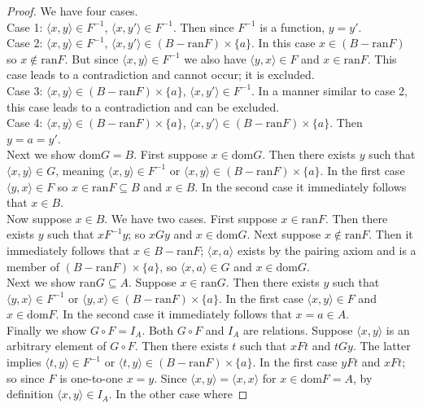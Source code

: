 \documentclass{report}
\begin{document}
\begin{proof}
We have four cases.\\
\indent Case 1: $\langle x,y\rangle\in F^{-1}$, $\langle x,y'\rangle\in F^{-1}$. Then since $F^{-1}$ is a function, $y=y'$.\\
\indent Case 2: $\langle x,y\rangle\in F^{-1}$, $\langle x,y'\rangle\in(B-\text{ran}F)\times\{a\}$.
In this case $x\in(B-\text{ran}F)$ so $x\notin\text{ran}F$. But since $\langle x,y\rangle\in F^{-1}$ we also have $\langle y,x\rangle\in F$ and $x\in\text{ran}F$. 
This case leads to a contradiction and cannot occur; it is excluded.\\
\indent Case 3: $\langle x,y\rangle\in(B-\text{ran}F)\times\{a\}$, $\langle x,y'\rangle\in F^{-1}$.
In a manner similar to case 2, this case leads to a contradiction and can be excluded.\\
\indent Case 4: $\langle x,y\rangle\in(B-\text{ran}F)\times\{a\}$, $\langle x,y'\rangle\in(B-\text{ran}F)\times\{a\}$. Then $y=a=y'$.\\
\indent Next we show dom$G=B$. First suppose $x\in\text{dom}G$. Then there exists $y$ such that $\langle x,y\rangle\in G$, meaning $\langle x,y\rangle\in F^{-1}$ or 
$\langle x,y\rangle\in(B-\text{ran}F)\times\{a\}$. In the first case $\langle y,x\rangle\in F$ so
$x\in\text{ran}F\subseteq B$ and $x\in B$. In the second case it immediately follows that $x\in B$.\\
\indent Now suppose $x\in B$. We have two cases. First suppose $x\in\text{ran}F$. Then there exists $y$ such that $xF^{-1}y$; so $xGy$ and $x\in\text{dom}G$. Next suppose $x\notin\text{ran}F$.
Then it immediately follows that $x\in B-\text{ran}F$; $\langle x,a\rangle$ exists by the pairing axiom and is a member of $(B-\text{ran}F)\times\{a\}$, so 
$\langle x,a\rangle\in G$ and $x\in\text{dom}G$.\\
\indent Next we show ran$G\subseteq A$. Suppose $x\in\text{ran}G$. Then there exists $y$ such that
$\langle y,x\rangle\in F^{-1}$ or $\langle y,x\rangle\in(B-\text{ran}F)\times\{a\}$. In the first case $\langle x,y\rangle\in F$ and $x\in\text{dom}F$. In the second case it immediately follows
that $x=a\in A$.\\
\indent Finally we show $G\circ F=I_A$. Both $G\circ F$ and $I_A$ are relations. Suppose $\langle x,y\rangle$ is an arbitrary element of $G\circ F$. Then there exists $t$ such that $xFt$ and $tGy$.
The latter implies $\langle t,y\rangle\in F^{-1}$ or $\langle t,y\rangle\in(B-\text{ran}F)\times\{a\}$. In the first case $yFt$ and $xFt$; so since $F$ is one-to-one $x=y$. 
Since $\langle x,y\rangle=\langle x,x\rangle$ for $x\in\text{dom}F=A$, by definition $\langle x,y\rangle\in I_A$. In the other case where 

\end{proof}
\end{document}
